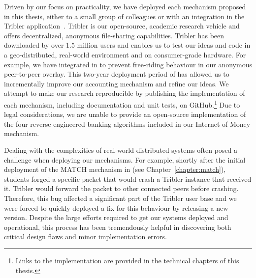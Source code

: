 Driven by our focus on practicality, we have deployed each mechanism proposed in this thesis, either to a small group of colleagues or with an integration in the Tribler application~\cite{zeilemaker2011tribler}.
Tribler is our open-source, academic research vehicle and offers decentralized, anonymous file-sharing capabilities.
Tribler has been downloaded by over 1.5 million users and enables us to test our ideas and code in a geo-distributed, real-world environment and on consumer-grade hardware.
For example, we have integrated \TrustChain{} in \Tribler{} to prevent free-riding behaviour in our anonymous peer-to-peer overlay.
This two-year deployment period of \TrustChain{} has allowed us to incrementally improve our accounting mechanism and refine our ideas.
We attempt to make our research reproducible by publishing the implementation of each mechanism, including documentation and unit tests, on GitHub.\footnote{Links to the implementation are provided in the technical chapters of this thesis.}
Due to legal considerations, we are unable to provide an open-source implementation of the four reverse-engineered banking algorithms included in our Internet-of-Money mechanism.

Dealing with the complexities of real-world distributed systems often posed a challenge when deploying our mechanisms.
For example, shortly after the initial deployment of the MATCH mechanism in \Tribler{} (see Chapter~\ref{chapter:match}), students forged a specific packet that would crash a Tribler instance that received it.
Tribler would forward the packet to other connected peers before crashing.
Therefore, this bug affected a significant part of the Tribler user base and we were forced to quickly deployed a fix for this behaviour by releasing a new version.
Despite the large efforts required to get our systems deployed and operational, this process has been tremendously helpful in discovering both critical design flaws and minor implementation errors.



